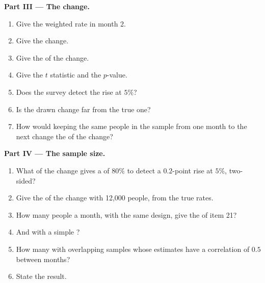 \begin{problem}
\medskip\noindent\textbf{Part III --- The change.}
\begin{enumerate}[resume]
  \item Give the weighted rate in month 2.
  \item Give the change.
  \item Give the  of the change.
  \item Give the $t$ statistic and the $p$-value.
  \item Does the survey detect the rise at $5\%$?
  \item Is the drawn change far from the true one?
  \item How would keeping the same people in the sample from one month to
    the next change the  of the change?
\end{enumerate}

\medskip\noindent\textbf{Part IV --- The sample size.}
\begin{enumerate}[resume]
  \item What  of the change gives a  of $80\%$ to detect a
    $0.2$-point rise at $5\%$, two-sided?
  \item Give the  of the change with 12,000 people, from the
    true rates.
  \item How many people a month, with the same design, give the  of item 21?
  \item And with a simple ?
  \item How many with overlapping samples whose estimates have a correlation
    of $0.5$ between months?
  \item State the result.
\end{enumerate}
\end{problem}
